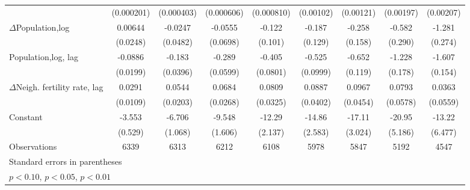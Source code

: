 \begin{table}[htbp]
\begin{tabular}{l*{8}{c}}
                    &  (0.000201)         &  (0.000403)         &  (0.000606)         &  (0.000810)         &   (0.00102)         &   (0.00121)         &   (0.00197)         &   (0.00207)         \\
[1em]
$\Delta$Population,log              &     0.00644         &     -0.0247         &     -0.0555         &      -0.122         &      -0.187         &      -0.258         &      -0.582\sym{**} &      -1.281\sym{***}\\
                    &    (0.0248)         &    (0.0482)         &    (0.0698)         &     (0.101)         &     (0.129)         &     (0.158)         &     (0.290)         &     (0.274)         \\
[1em]
Population,log, lag             &     -0.0886\sym{***}&      -0.183\sym{***}&      -0.289\sym{***}&      -0.405\sym{***}&      -0.525\sym{***}&      -0.652\sym{***}&      -1.228\sym{***}&      -1.607\sym{***}\\
                    &    (0.0199)         &    (0.0396)         &    (0.0599)         &    (0.0801)         &    (0.0999)         &     (0.119)         &     (0.178)         &     (0.154)         \\
[1em]
$\Delta$Neigh. fertility rate, lag&      0.0291\sym{***}&      0.0544\sym{***}&      0.0684\sym{**} &      0.0809\sym{**} &      0.0887\sym{**} &      0.0967\sym{**} &      0.0793         &      0.0363         \\
                    &    (0.0109)         &    (0.0203)         &    (0.0268)         &    (0.0325)         &    (0.0402)         &    (0.0454)         &    (0.0578)         &    (0.0559)         \\
[1em]
Constant            &      -3.553\sym{***}&      -6.706\sym{***}&      -9.548\sym{***}&      -12.29\sym{***}&      -14.86\sym{***}&      -17.11\sym{***}&      -20.95\sym{***}&      -13.22\sym{**} \\
                    &     (0.529)         &     (1.068)         &     (1.606)         &     (2.137)         &     (2.583)         &     (3.024)         &     (5.186)         &     (6.477)         \\
\hline
Observations        &        6339         &        6313         &        6212         &        6108         &        5978         &        5847         &        5192         &        4547         \\
\hline\hline
\multicolumn{9}{l}{\footnotesize Standard errors in parentheses}\\
\multicolumn{9}{l}{\footnotesize \sym{*} \(p<0.10\), \sym{**} \(p<0.05\), \sym{***} \(p<0.01\)}\\
\end{tabular}
\end{table}
